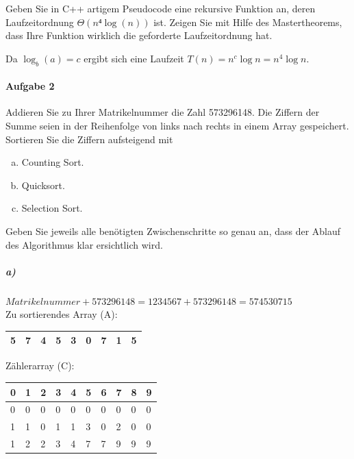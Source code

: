 \documentclass[a4paper, 12pt]{article}
\begin{document}
Geben Sie in C++ artigem Pseudocode eine rekursive Funktion an, deren
Laufzeitordnung $Θ\left( n⁴ \log \left( n \right) \right)$ ist. Zeigen Sie mit
Hilfe des Mastertheorems, dass Ihre Funktion wirklich die geforderte
Laufzeitordnung hat.

\begin{leftbar}
	
\end{leftbar}

Da $\log_b (a) = c$ ergibt sich eine Laufzeit $T(n) = n^c \log n = n^4 \log n$.

\paragraph{Aufgabe 2}

Addieren Sie zu Ihrer Matrikelnummer die Zahl 573296148. Die Ziffern der Summe
seien in der Reihenfolge von links nach rechts in einem Array gespeichert.
Sortieren Sie die Ziffern aufsteigend mit

\begin{enumerate}[a.]
	\item Counting Sort.
	\item Quicksort.
	\item Selection Sort.
\end{enumerate}

Geben Sie jeweils alle benötigten Zwischenschritte so genau an, dass der
Ablauf des Algorithmus klar ersichtlich wird.

\subparagraph{a)}

$ Matrikelnummer + 573 296 148 = 1 234 567 + 573 296 148 =  574 530 715 $\\

Zu sortierendes Array (A):
\begin{center}
	\newcommand{\columnWidth}{0.5cm}
	\begin{tabular}{|p{\columnWidth}|p{\columnWidth}|p{\columnWidth}
					|p{\columnWidth}|p{\columnWidth}|p{\columnWidth}
					|p{\columnWidth}|p{\columnWidth}|p{\columnWidth}|}
		\hline
		5 & 7 & 4 & 5 & 3 & 0 & 7 & 1 & 5\\
		\hline
	\end{tabular}
\end{center}

Zählerarray (C):

\begin{center}
	\newcommand{\columnWidth}{0.5cm}
	\begin{tabular}{|p{\columnWidth}|p{\columnWidth}|p{\columnWidth}
					|p{\columnWidth}|p{\columnWidth}|p{\columnWidth}
					|p{\columnWidth}|p{\columnWidth}|p{\columnWidth}|
					p{\columnWidth}|}
		\hline
		0 & 1 & 2 & 3 & 4 & 5 & 6 & 7 & 8 & 9\\
		\hline
		\hline
		0 & 0 & 0 & 0 & 0 & 0 & 0 & 0 & 0 & 0\\
		1 & 1 & 0 & 1 & 1 & 3 & 0 & 2 & 0 & 0\\
		1 & 2 & 2 & 3 & 4 & 7 & 7 & 9 & 9 & 9\\
		\hline
	\end{tabular}
\end{center}
\end{document}
